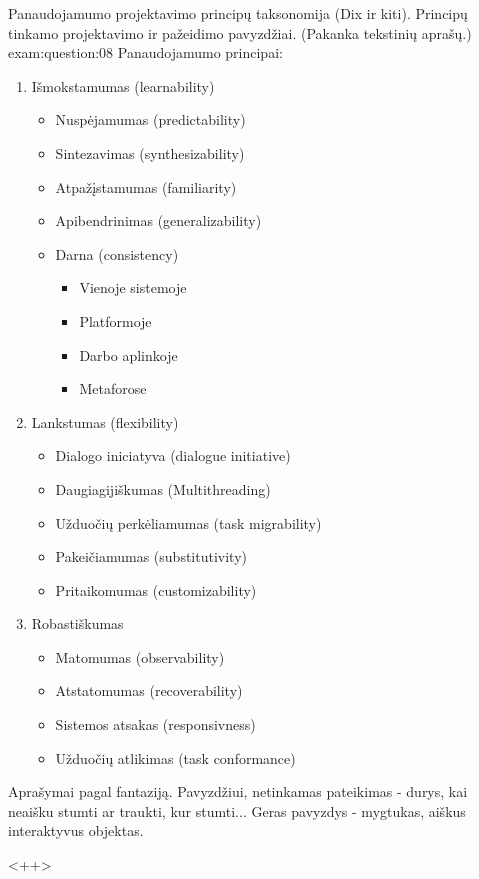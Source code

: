 \begin{question}{%
  Panaudojamumo projektavimo principų taksonomija (Dix ir kiti).
  Principų tinkamo projektavimo ir pažeidimo pavyzdžiai. (Pakanka
  tekstinių aprašų.)
  }{exam:question:08}
  Panaudojamumo principai:
  \begin{enumerate}
    \item Išmokstamumas (learnability)
      \begin{itemize}
        \item Nuspėjamumas (predictability)
        \item Sintezavimas (synthesizability)
        \item Atpažįstamumas (familiarity)
        \item Apibendrinimas (generalizability)
        \item Darna (consistency)
          \begin{itemize}
            \item Vienoje sistemoje
            \item Platformoje
            \item Darbo aplinkoje
            \item Metaforose
          \end{itemize}
      \end{itemize}
    \item Lankstumas (flexibility)
      \begin{itemize}
        \item Dialogo iniciatyva (dialogue initiative)
        \item Daugiagijiškumas (Multithreading)
        \item Užduočių perkėliamumas (task migrability)
        \item Pakeičiamumas (substitutivity)
        \item Pritaikomumas (customizability)
      \end{itemize}
    \item Robastiškumas
      \begin{itemize}
        \item Matomumas (observability)
        \item Atstatomumas (recoverability)
        \item Sistemos atsakas (responsivness)
        \item Užduočių atlikimas (task conformance)
      \end{itemize}
  \end{enumerate}
  
  Aprašymai pagal fantaziją. Pavyzdžiui, netinkamas pateikimas - durys, kai neaišku stumti ar traukti, kur stumti... Geras pavyzdys - mygtukas, aiškus interaktyvus objektas.
  
  <++>
\end{question}

